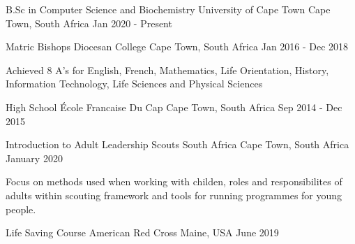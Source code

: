 

\begin{cventries}

  \cventry
    {B.Sc in Computer Science and Biochemistry} %
    {University of Cape Town} %
    {Cape Town, South Africa} %
    {Jan 2020 - Present} %
    {}

\cventry
{Matric} %
{Bishops Diocesan College} %
{Cape Town, South Africa} %
{Jan 2016 - Dec 2018} %
{
  \begin{cvitems}
  \item {Achieved 8 A's for English, French, Mathematics, Life Orientation, History, Information Technology, Life Sciences and Physical Sciences}
  \end{cvitems}
  }

\cventry
{High School} %
{École Francaise Du Cap} %
{Cape Town, South Africa} %
{Sep 2014 - Dec 2015} %
{}


\end{cventries}


\begin{cventries}

\cventry
{Introduction to Adult Leadership} %
{Scouts South Africa} %
{Cape Town, South Africa} %
{January 2020} %
{
  \begin{cvitems}
    \item {Focus on methods used when working with childen, roles and responsibilites of adults within scouting framework and tools for running programmes for young people.}
  \end{cvitems}}

\cventry
{Life Saving Course} %
{American Red Cross} %
{Maine, USA} %
{June 2019} %
{}



\end{cventries}

